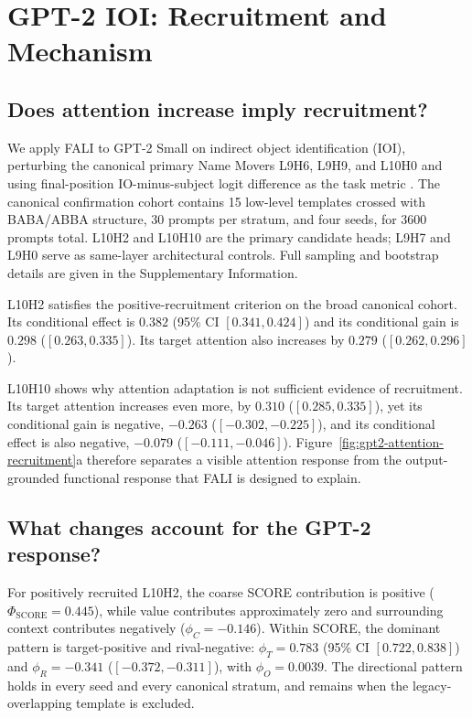 \section{GPT-2 IOI: Recruitment and Mechanism}\label{sec:gpt2}

\subsection{Does attention increase imply recruitment?}\label{sec:gpt2-functional}

We apply FALI to GPT-2 Small on indirect object identification (IOI), perturbing the canonical primary Name Movers L9H6, L9H9, and L10H0 and using final-position IO-minus-subject logit difference as the task metric \citep{wang2023ioi}. The canonical confirmation cohort contains 15 low-level templates crossed with BABA/ABBA structure, 30 prompts per stratum, and four seeds, for 3600 prompts total. L10H2 and L10H10 are the primary candidate heads; L9H7 and L9H0 serve as same-layer architectural controls. Full sampling and bootstrap details are given in the Supplementary Information.

L10H2 satisfies the positive-recruitment criterion on the broad canonical cohort. Its conditional effect is $0.382$ (95\% CI $[0.341,0.424]$) and its conditional gain is $0.298$ ($[0.263,0.335]$). Its target attention also increases by $0.279$ ($[0.262,0.296]$).

L10H10 shows why attention adaptation is not sufficient evidence of recruitment. Its target attention increases even more, by $0.310$ ($[0.285,0.335]$), yet its conditional gain is negative, $-0.263$ ($[-0.302,-0.225]$), and its conditional effect is also negative, $-0.079$ ($[-0.111,-0.046]$). Figure~\ref{fig:gpt2-attention-recruitment}a therefore separates a visible attention response from the output-grounded functional response that FALI is designed to explain.




\subsection{What changes account for the GPT-2 response?}\label{sec:gpt2-fali}

For positively recruited L10H2, the coarse SCORE contribution is positive ($\Phi_{\mathrm{SCORE}}=0.445$), while value contributes approximately zero and surrounding context contributes negatively ($\phi_C=-0.146$). Within SCORE, the dominant pattern is target-positive and rival-negative: $\phi_T=0.783$ (95\% CI $[0.722,0.838]$) and $\phi_R=-0.341$ ($[-0.372,-0.311]$), with $\phi_O=0.0039$. The directional pattern holds in every seed and every canonical stratum, and remains when the legacy-overlapping template is excluded.

